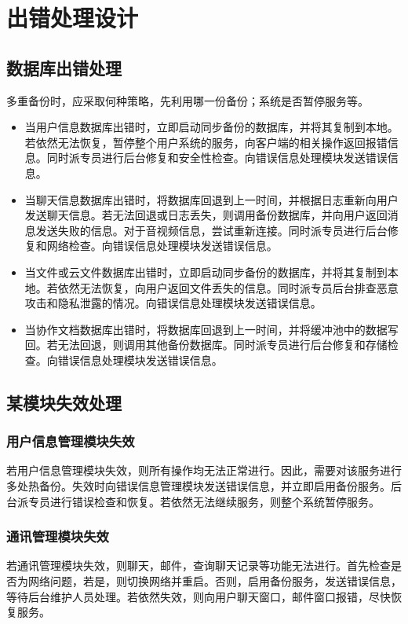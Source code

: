 \chapter{\color{red} 出错处理设计}
\section{数据库出错处理}
多重备份时，应采取何种策略，先利用哪一份备份；系统是否暂停服务等。

\begin{itemize}
    \item 当用户信息数据库出错时，立即启动同步备份的数据库，并将其复制到本地。若依然无法恢复，暂停整个用户系统的服务，向客户端的相关操作返回报错信息。同时派专员进行后台修复和安全性检查。向错误信息处理模块发送错误信息。
    \item  当聊天信息数据库出错时，将数据库回退到上一时间，并根据日志重新向用户发送聊天信息。若无法回退或日志丢失，则调用备份数据库，并向用户返回消息发送失败的信息。对于音视频信息，尝试重新连接。同时派专员进行后台修复和网络检查。向错误信息处理模块发送错误信息。
    \item 当文件或云文件数据库出错时，立即启动同步备份的数据库，并将其复制到本地。若依然无法恢复，向用户返回文件丢失的信息。同时派专员后台排查恶意攻击和隐私泄露的情况。向错误信息处理模块发送错误信息。
    \item 当协作文档数据库出错时，将数据库回退到上一时间，并将缓冲池中的数据写回。若无法回退，则调用其他备份数据库。同时派专员进行后台修复和存储检查。向错误信息处理模块发送错误信息。

\end{itemize}


\section{\color{red} 某模块失效处理}
\subsection{用户信息管理模块失效}
若用户信息管理模块失效，则所有操作均无法正常进行。因此，需要对该服务进行多处热备份。失效时向错误信息管理模块发送错误信息，并立即启用备份服务。后台派专员进行错误检查和恢复。若依然无法继续服务，则整个系统暂停服务。
\subsection{通讯管理模块失效}
若通讯管理模块失效，则聊天，邮件，查询聊天记录等功能无法进行。首先检查是否为网络问题，若是，则切换网络并重启。否则，启用备份服务，发送错误信息，等待后台维护人员处理。若依然失效，则向用户聊天窗口，邮件窗口报错，尽快恢复服务。
